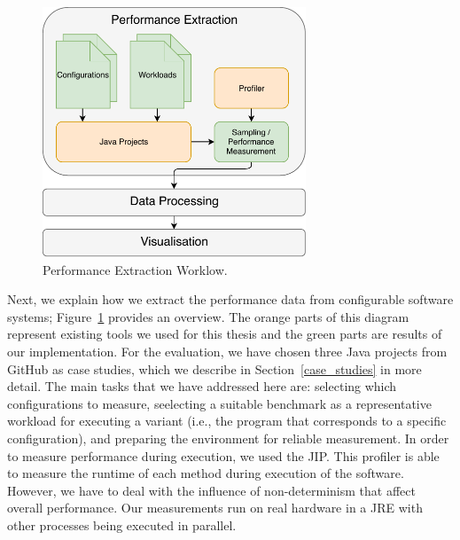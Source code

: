 \begin{figure}
  \centering
  \includegraphics[width=0.7\textwidth]{images/workflow_perf_expanded}
  \caption{Performance Extraction Worklow.}
  \label{perf_extr_workflow}
\end{figure}


Next, we explain how we extract the performance data from configurable software systems; Figure~\ref{perf_extr_workflow} provides an overview. The orange parts of this diagram represent existing tools we used for this thesis and the green parts are results of our implementation. For the evaluation, we have chosen three Java projects from GitHub as case studies, which we describe in Section~\ref{case_studies} in more detail. The main tasks that we have addressed here are: selecting which configurations to measure, seelecting a suitable benchmark as a representative workload for executing a variant (i.e., the program that corresponds to a specific configuration), and preparing the environment for reliable measurement. In order to measure performance during execution, we used the \ac{JIP}. This profiler is able to measure the runtime of each method during execution of the software. However, we have to deal with the influence of non-determinism that affect overall performance. Our measurements run on real hardware in a \ac{JRE} with other processes being executed in parallel. 


